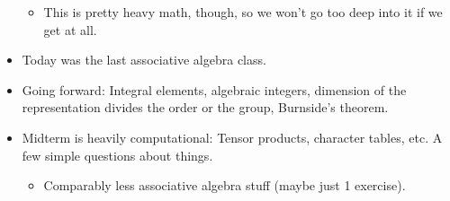 \documentclass[../notes.tex]{subfiles}
\begin{document}
\begin{itemize}
\begin{itemize}
        \item This is pretty heavy math, though, so we won't go too deep into it if we get at all.
    \end{itemize}
    \item Today was the last associative algebra class.
    \item Going forward: Integral elements, algebraic integers, dimension of the representation divides the order or the group, Burnside's theorem.
    \item Midterm is heavily computational: Tensor products, character tables, etc. A few simple questions about things.
    \begin{itemize}
        \item Comparably less associative algebra stuff (maybe just 1 exercise).
    \end{itemize}
\end{itemize}
\end{document}
